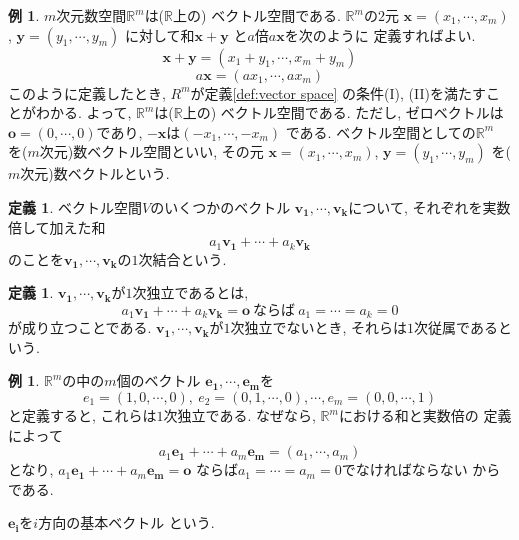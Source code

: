 \documentclass[a4j,12pt]{jarticle}
\theoremstyle{definition}
\newtheorem{definition}[theorem]{定義}
\newtheorem{example}[theorem]{例}
\begin{document}
\begin{example}
    $m$次元数空間$\mathbb{R}^m$は($\mathbb{R}$上の)
    ベクトル空間である. 
    $\mathbb{R}^m$の$2$元
    $\boldsymbol{x}=(x_1,\cdots ,x_m)$, 
    $\boldsymbol{y}=(y_1,\cdots ,y_m)$
    に対して和$\boldsymbol{x}+\boldsymbol{y}$
    と$a$倍$a\boldsymbol{x}$を次のように
    定義すればよい. 
    $$\boldsymbol{x}+\boldsymbol{y}=
    (x_1+y_1,\cdots ,x_m+y_m)$$
    $$a\boldsymbol{x}=(ax_1,\cdots ,ax_m)$$
    このように定義したとき, $R^m$が定義\ref{def:vector space}
    の条件(I), (II)を満たすことがわかる. 
    よって, $\mathbb{R}^m$は($\mathbb{R}$上の)
    ベクトル空間である. ただし, ゼロベクトルは
    $\boldsymbol{o}=(0,\cdots ,0)$であり, 
    $-\boldsymbol{x}$は$(-x_1,\cdots ,-x_m)$
    である. ベクトル空間としての$\mathbb{R}^m$
    を($m$次元)数ベクトル空間といい, その元
    $\boldsymbol{x}=(x_1,\cdots ,x_m)$, 
    $\boldsymbol{y}=(y_1,\cdots ,y_m)$
    を($m$次元)数ベクトルという. 
\end{example}
\begin{definition}
    ベクトル空間$V$のいくつかのベクトル
    $\boldsymbol{v_1},\cdots ,
    \boldsymbol{v_k}$について, それぞれを実数倍して加えた和
    $$a_1\boldsymbol{v_1}+\cdots +
    a_k\boldsymbol{v_k}$$
    のことを$\boldsymbol{v_1},\cdots ,
    \boldsymbol{v_k}$の$1$次結合という. 
\end{definition}
\begin{definition}
    $\boldsymbol{v_1},\cdots ,
    \boldsymbol{v_k}$が$1$次独立であるとは, 
    $$a_1\boldsymbol{v_1}+\cdots +
    a_k\boldsymbol{v_k}=\boldsymbol{o}\ 
    \text{ならば}\ a_1=\cdots =a_k=0$$
    が成り立つことである. 
    $\boldsymbol{v_1},\cdots ,
    \boldsymbol{v_k}$が$1$次独立でないとき, 
    それらは$1$次従属であるという. 
\end{definition}
\begin{example}\label{def:fundamental vector of R^m}
    $\mathbb{R}^m$の中の$m$個のベクトル
    $\boldsymbol{e_1},\cdots ,
    \boldsymbol{e_m}$を
    $$e_1=(1,0,\cdots ,0),\ e_2=(0,1,\cdots ,0), 
    \cdots ,e_m=(0,0,\cdots ,1)$$
    と定義すると, これらは$1$次独立である. 
    なぜなら, $\mathbb{R}^m$における和と実数倍の
    定義によって
    $$a_1\boldsymbol{e_1}+\cdots +a_m\boldsymbol{e_m}
    =(a_1,\cdots ,a_m)$$
    となり, $a_1\boldsymbol{e_1}+\cdots +
    a_m\boldsymbol{e_m}=\boldsymbol{o}$
    ならば$a_1=\cdots =a_m=0$でなければならない
    からである. 

    $\boldsymbol{e_i}$を$i$方向の基本ベクトル
    という. 
\end{example}
\end{document}
